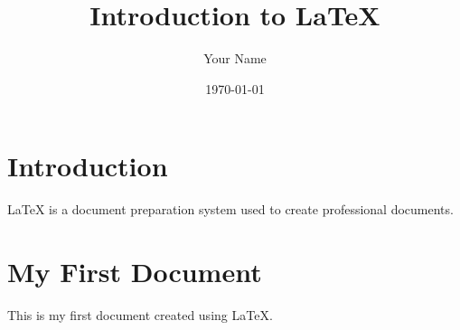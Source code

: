 \documentclass{article}
\title{Introduction to LaTeX}
\author{Your Name}
\date{\today}
\begin{document}
\maketitle

\section{Introduction}

LaTeX is a document preparation system
used to create professional documents.

\section{My First Document}

This is my first document created using LaTeX.
\end{document}
